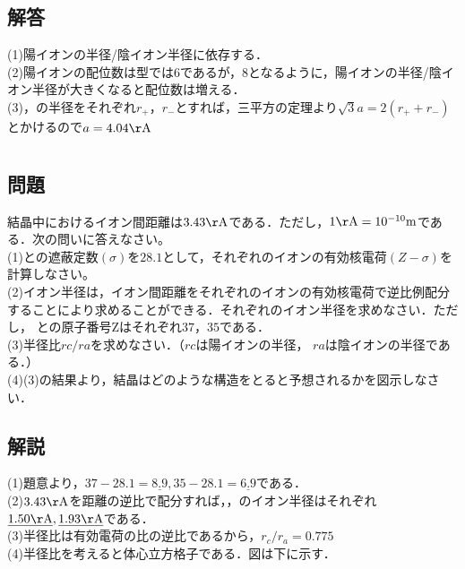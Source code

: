 \documentclass[dvipdfmx]{article}
\begin{document}
  \subsection*{解答}
     (1)陽イオンの半径/陰イオン半径に依存する．\\
     (2)陽イオンの配位数は型では6であるが，8となるように，陽イオンの半径/陰イオン半径が大きくなると配位数は増える．\\
     (3)，の半径をそれぞれ$r_+$，$r_-$とすれば，三平方の定理より$\sqrt{3} a = 2(r_+ + r_-)$とかけるので$a = 4.04 \mathrm{\AA}$
\section{}
  \subsection*{問題} %
    結晶中におけるイオン間距離は$3.43 \mathrm{\AA}$である．ただし，$1 \mathrm{\AA}=10^{-10}\mathrm{m}$である．次の問いに答えなさい。\\
    (1)との遮蔽定数$(\sigma)$を$28.1$として，それぞれのイオンの有効核電荷$(Z-\sigma)$を計算しなさい。\\
    (2)イオン半径は，イオン間距離をそれぞれのイオンの有効核電荷で逆比例配分することにより求めることができる．それぞれのイオン半径を求めなさい．ただし，
    との原子番号Zはそれぞれ$37$，$35$である．\\
    (3)半径比$rc/ra$を求めなさい．（$rc$は陽イオンの半径， $ra$は陰イオンの半径である．）\\
    (4)(3)の結果より，結晶はどのような構造をとると予想されるかを図示しなさい．\\
  \subsection*{解説}
    (1)題意より，$37-28.1 = \underline{8.9}, 35 - 28.1 = \underline{6.9}$である．\\
    (2)$3.43\mathrm{\AA}$を距離の逆比で配分すれば，，のイオン半径はそれぞれ$\underline{1.50\mathrm{\AA}}, \underline{1.93\mathrm{\AA}}$である．\\
    (3)半径比は有効電荷の比の逆比であるから，$r_c/r_a =0.775$\\
    (4)半径比を考えると体心立方格子である．図は下に示す．
  
\end{document}
